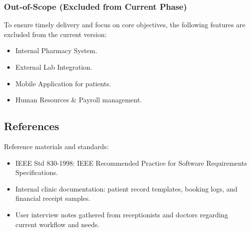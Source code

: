 \subsubsection{Out-of-Scope (Excluded from Current Phase)}

To ensure timely delivery and focus on core objectives, the following features are excluded from the current version:

\begin{itemize}
	\item Internal Pharmacy System.
	\item External Lab Integration.
	\item Mobile Application for patients.
	\item Human Resources \& Payroll management.
\end{itemize}

\subsection{References}

Reference materials and standards:

\begin{itemize}
	\item IEEE Std 830-1998: IEEE Recommended Practice for Software Requirements Specifications.
	\item Internal clinic documentation: patient record templates, booking logs, and financial receipt samples.
	\item User interview notes gathered from receptionists and doctors regarding current workflow and needs.
\end{itemize}